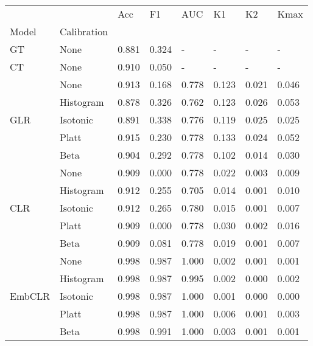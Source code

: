 \begin{tabular}{llllllll}
\toprule
 &  & Acc & F1 & AUC & K1 & K2 & Kmax \\
Model & Calibration &  &  &  &  &  &  \\
\midrule
GT & None & 0.881 & 0.324 & - & - & - & - \\
\cline{1-8}
CT & None & 0.910 & 0.050 & - & - & - & - \\
\cline{1-8}
\multirow[t]{5}{*}{GLR} & None & 0.913 & 0.168 & 0.778 & 0.123 & 0.021 & 0.046 \\
 & Histogram & 0.878 & 0.326 & 0.762 & 0.123 & 0.026 & 0.053 \\
 & Isotonic & 0.891 & 0.338 & 0.776 & 0.119 & 0.025 & 0.025 \\
 & Platt & 0.915 & 0.230 & 0.778 & 0.133 & 0.024 & 0.052 \\
 & Beta & 0.904 & 0.292 & 0.778 & 0.102 & 0.014 & 0.030 \\
\cline{1-8}
\multirow[t]{5}{*}{CLR} & None & 0.909 & 0.000 & 0.778 & 0.022 & 0.003 & 0.009 \\
 & Histogram & 0.912 & 0.255 & 0.705 & 0.014 & 0.001 & 0.010 \\
 & Isotonic & 0.912 & 0.265 & 0.780 & 0.015 & 0.001 & 0.007 \\
 & Platt & 0.909 & 0.000 & 0.778 & 0.030 & 0.002 & 0.016 \\
 & Beta & 0.909 & 0.081 & 0.778 & 0.019 & 0.001 & 0.007 \\
\cline{1-8}
\multirow[t]{5}{*}{EmbCLR} & None & 0.998 & 0.987 & 1.000 & 0.002 & 0.001 & 0.001 \\
 & Histogram & 0.998 & 0.987 & 0.995 & 0.002 & 0.000 & 0.002 \\
 & Isotonic & 0.998 & 0.987 & 1.000 & 0.001 & 0.000 & 0.000 \\
 & Platt & 0.998 & 0.987 & 1.000 & 0.006 & 0.001 & 0.003 \\
 & Beta & 0.998 & 0.991 & 1.000 & 0.003 & 0.001 & 0.001 \\
\cline{1-8}
\bottomrule
\end{tabular}
